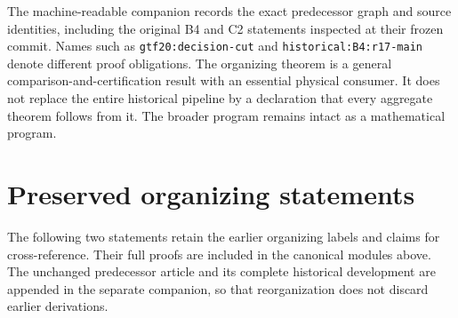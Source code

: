 The machine-readable companion records the exact predecessor graph and
source identities, including the original B4 and C2 statements inspected
at their frozen commit. Names such as \texttt{gtf20:decision-cut} and
\texttt{historical:B4:r17-main} denote different proof obligations.
The organizing theorem is a general comparison-and-certification result
with an essential physical consumer. It does not replace the entire
historical pipeline by a declaration that every aggregate theorem follows
from it. The broader program remains intact as a mathematical program.

\section{Preserved organizing statements}
The following two statements retain the earlier organizing labels and
claims for cross-reference. Their full proofs are included in the
canonical modules above. The unchanged predecessor article and its
complete historical development are appended in the separate companion,
so that reorganization does not discard earlier derivations.


